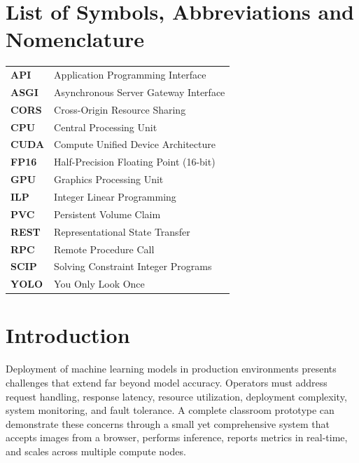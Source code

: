 \documentclass[12pt,a4paper]{report}
\begin{document}
\tableofcontents

\listoffigures

\chapter*{List of Symbols, Abbreviations and Nomenclature}
\renewcommand{\arraystretch}{1.2}
\begin{center}
\begin{tabular}{>{\bfseries}p{} p{}}
API   & Application Programming Interface \\
ASGI  & Asynchronous Server Gateway Interface \\
CORS  & Cross-Origin Resource Sharing \\
CPU   & Central Processing Unit \\
CUDA  & Compute Unified Device Architecture \\
FP16  & Half-Precision Floating Point (16-bit) \\
GPU   & Graphics Processing Unit \\
ILP   & Integer Linear Programming \\
PVC   & Persistent Volume Claim \\
REST  & Representational State Transfer \\
RPC   & Remote Procedure Call \\
SCIP  & Solving Constraint Integer Programs \\
YOLO  & You Only Look Once \\
\end{tabular}
\end{center}

\clearpage
{}

\chapter{Introduction}
Deployment of machine learning models in production environments presents challenges that extend far beyond model accuracy. Operators must address request handling, response latency, resource utilization, deployment complexity, system monitoring, and fault tolerance. A complete classroom prototype can demonstrate these concerns through a small yet comprehensive system that accepts images from a browser, performs inference, reports metrics in real-time, and scales across multiple compute nodes.
\end{document}
